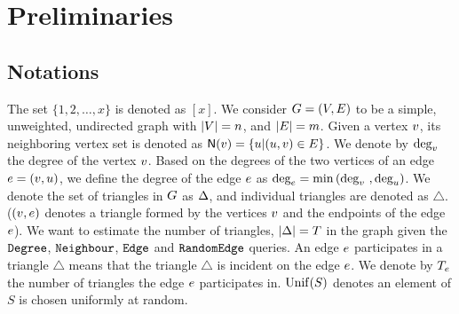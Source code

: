 \section{Preliminaries}
\label{sec:prelim}
\subsection{Notations}
\label{ssec:notation}
The set $\{1,2,\ldots,x\}$ is denoted as $[x]$.
We consider $G = (V,E)$ to be a simple, unweighted, undirected graph with $\left|{V}\right| = n$, and $\left|{E}\right| = m$. Given a vertex $v$, its neighboring vertex set is denoted as ${\sf N}(v) = \left\{{u|(u,v)\in E}\right\}$. We denote by $\mbox{deg}_{v}$ the degree of the vertex $v$. Based on the degrees of the two vertices of an edge $e = \left({v,u}\right)$, we define the degree of the edge $e$ as $\mbox{deg}_{e} = \min\left({\mbox{deg}_{v}~,\mbox{deg}_{u}}\right)$. We denote the set of triangles in $G$ as $\Delta$, and individual triangles are denoted as $\triangle$. ($\left({v,e}\right)$ denotes a triangle formed by the vertices $v$ and the endpoints of the edge $e$). We want to estimate the number of triangles,  $\left|{\Delta}\right| = T$ in the graph given the $\texttt{Degree}$, $\texttt{Neighbour}$, $\texttt{Edge}$ and $\texttt{RandomEdge}$ queries. An edge $e$ participates in a triangle $\triangle$ means that the triangle $\triangle$ is incident on the edge $e$. We denote by $T_e$ the number of triangles the edge $e$ participates in. $\mathrm{Unif}(S)$ denotes an element of $S$ is chosen uniformly at random. 

